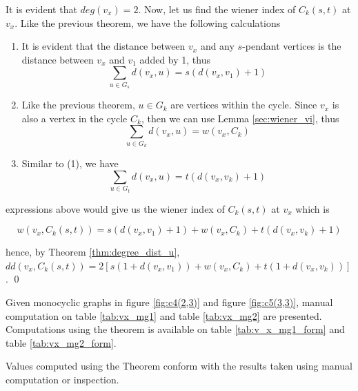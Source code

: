
\proof
It is evident that $deg(v_x)=2$. Now, let us find the wiener index of $C_k(s,t)$ at $v_x$. Like the previous theorem, we have the following calculations

\begin{enumerate}
\item {It is evident that the distance between $v_x$ and any $s$-pendant vertices is the distance between $v_x$ and $v_1$ added by 1, thus
$$\sum_{u\in G_s}d(v_x,u)=s(d(v_x,v_1)+1)$$
}
\item {Like the previous theorem, $u\in G_k$ are vertices within the cycle. Since $v_x$ is also a vertex in the cycle $C_k$, then we can use Lemma \href{chap2.tex}{\ref{sec:wiener_vi}}, thus
$$\sum_{u\in G_k}d(v_x,u)=w(v_x,C_k)$$
}
\item {Similar to (1), we have
$$\sum_{u\in G_t}d(v_x,u)=t(d(v_x,v_k)+1)$$
 }
\end{enumerate}

expressions above would give us the wiener index of $C_k(s,t)$ at $v_x$ which is

\begin{equation}
w(v_x,C_k(s,t))=s(d(v_x,v_1)+1)+w(v_x,C_k)+t(d(v_x,v_k)+1)
\label{wiener_vx}
\end{equation} 

hence, by Theorem  \ref{thm:degree_dist_u}, $dd(v_x,C_k(s,t))=2\left[s(1+d(v_x,v_1))+w(v_x,C_k)+t(1+d(v_x,v_k))\right]$. \qed

\begin{e.g.}\rm
Given monocyclic graphs in figure \ref{fig:c4(2,3)} and figure \ref{fig:c5(3,3)}, manual computation on table \ref{tab:vx_mg1} and table \ref{tab:vx_mg2} are presented. Computations using the theorem is available on table \ref{tab:v_x_mg1_form} and table \ref{tab:vx_mg2_form}. 

Values computed using the Theorem conform with the results taken using manual computation or inspection.
\end{e.g.}

